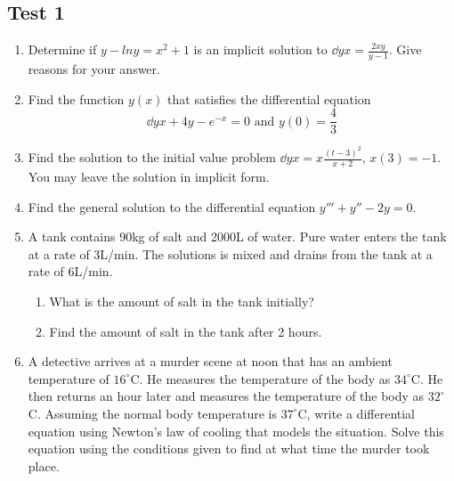 \subsection{Test 1}

\begin{enumerate}[label=\arabic*.]
	\item 
		Determine if $y - ln{y} = x^2 + 1$ is an implicit solution to $\dd{y}{x} = \frac{2xy}{y-1}$. Give reasons for your answer.
	\item 
		Find the function $y(x)$ that satisfies the differential equation
		\begin{equation*}
			\dd{y}{x} + 4y - e^{-x} = 0 \text{ and } y(0) = \frac{4}{3}
		\end{equation*}
	\item
		Find the solution to the initial value problem $\dd{y}{x} = x\frac{(t-3)^2}{x+2} \text{, } x(3) = -1$. You may leave the solution in implicit form.
	\item
		Find the general solution to the differential equation $y''' + y'' - 2y = 0$.
	\item
		A tank contains 90kg of salt and 2000L of water. Pure water enters the tank at a rate of 3L/min. The solutions is mixed and drains from the tank at a rate of 6L/min.
		\begin{enumerate}[label=(\alph*)]
			\item
				What is the amount of salt in the tank initially?
			\item 
				Find the amount of salt in the tank after 2 hours.
		\end{enumerate}
	\item
		A detective arrives at a murder scene at noon that has an ambient temperature of $16^{\circ}$C. He measures the temperature of the body as $34^{\circ}$C. He then returns an hour later and measures the temperature of the body as $32^{\circ}$C.
		Assuming the normal body temperature is $37^{\circ}$C, write a differential equation using Newton's law of cooling that models the situation. Solve this equation using the conditions given to find at what time the murder took place.
\end{enumerate}